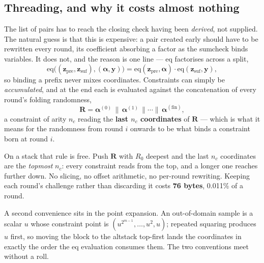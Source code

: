\documentclass[11pt,a4paper]{article}
\newcommand{\eqp}{\mathrm{eq}}
\begin{document}
\subsection*{Threading, and why it costs almost nothing}

The list of pairs has to reach the closing check having been \emph{derived}, not supplied. The
natural guess is that this is expensive: a pair created early should have to be rewritten every
round, its coefficient absorbing a factor as the sumcheck binds variables. It does not, and the
reason is one line --- $\eqp$ factorises across a split,
\[
  \eqp\bigl((\boldsymbol z_{\mathrm{pre}},\boldsymbol z_{\mathrm{suf}}),
            (\boldsymbol\alpha,\boldsymbol y)\bigr)
  =\eqp(\boldsymbol z_{\mathrm{pre}},\boldsymbol\alpha)\cdot
   \eqp(\boldsymbol z_{\mathrm{suf}},\boldsymbol y),
\]
so binding a prefix never mixes coordinates. Constraints can simply be \emph{accumulated}, and at
the end each is evaluated against the concatenation of every round's folding randomness,
\[
  \boldsymbol R=\boldsymbol\alpha^{(0)}\,\|\,\boldsymbol\alpha^{(1)}\,\|\cdots\|\,
  \boldsymbol\alpha^{(\mathrm{fin})},
\]
a constraint of arity $n_{c}$ reading the \textbf{last $n_{c}$ coordinates} of $\boldsymbol R$ ---
which is what it means for the randomness from round $i$ onwards to be what binds a constraint born
at round $i$.

On a stack that rule is free. Push $\boldsymbol R$ with $R_{0}$ deepest and the last $n_{c}$
coordinates are the \emph{topmost} $n_{c}$: every constraint reads from the top, and a longer one
reaches further down. No slicing, no offset arithmetic, no per-round rewriting. Keeping each round's
challenge rather than discarding it costs \textbf{76 bytes}, 0.011\% of a round.

A second convenience sits in the point expansion. An out-of-domain sample is a scalar $u$ whose
constraint point is $(u^{2^{m-1}},\dots,u^{2},u)$; repeated squaring produces $u$ first, so moving
the block to the altstack top-first lands the coordinates in exactly the order the $\eqp$ evaluation
consumes them. The two conventions meet without a roll.
\end{document}
